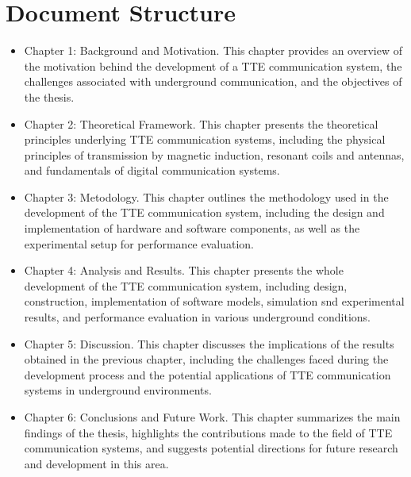 \section{Document Structure}
\begin{itemize}
    \item Chapter 1: Background and Motivation. This chapter provides an overview of the motivation behind the development of a TTE communication system, the challenges associated with underground communication, and the objectives of the thesis.
    \item Chapter 2: Theoretical Framework. This chapter presents the theoretical principles underlying TTE communication systems, including the physical principles of transmission by magnetic induction, resonant coils and antennas, and fundamentals of digital communication systems.
    \item  Chapter 3: Metodology. This chapter outlines the methodology used in the development of the TTE communication system, including the design and implementation of hardware and software components, as well as the experimental setup for performance evaluation.
    \item Chapter 4: Analysis and Results. This chapter presents the whole development of the TTE communication system, including design, construction, implementation of software models, simulation snd experimental results, and performance evaluation in various underground conditions.
    \item Chapter 5: Discussion. This chapter discusses the implications of the results obtained in the previous chapter, including the challenges faced during the development process and the potential applications of TTE communication systems in underground environments.
    \item Chapter 6: Conclusions and Future Work. This chapter summarizes the main findings of the thesis, highlights the contributions made to the field of TTE communication systems, and suggests potential directions for future research and development in this area.
\end{itemize}

